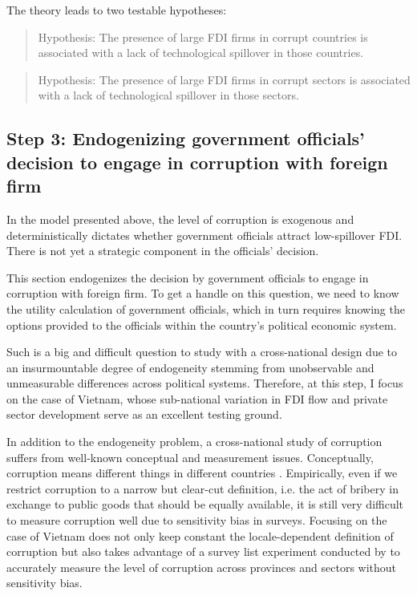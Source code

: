 The theory leads to two testable hypotheses:

\begin{quote}
Hypothesis: The presence of large FDI firms in corrupt countries is associated with a lack of technological spillover in those countries.
\end{quote}

\begin{quote}
Hypothesis: The presence of large FDI firms in corrupt sectors is associated with a lack of technological spillover in those sectors.
\end{quote}

\subsection{Step 3: Endogenizing government officials' decision to engage in corruption with foreign firm}

In the model presented above, the level of corruption is exogenous and deterministically dictates whether government officials attract low-spillover FDI. There is not yet a strategic component in the officials' decision. 

This section endogenizes the decision by government officials to engage in corruption with foreign firm. To get a handle on this question, we need to know the utility calculation of government officials, which in turn requires knowing the options provided to the officials within the country's political economic system. 

Such is a big and difficult question to study with a cross-national design due to an insurmountable degree of endogeneity stemming from unobservable and unmeasurable differences across political systems. Therefore, at this step, I focus on the case of Vietnam, whose sub-national variation in FDI flow and private sector development serve as an excellent testing ground.

In addition to the endogeneity problem, a cross-national study of corruption suffers from well-known conceptual and measurement issues. Conceptually, corruption means different things in different countries \citep{Rosen2010}. Empirically, even if we restrict corruption to a narrow but clear-cut definition, i.e. the act of bribery in exchange to public goods that should be equally available, it is still very difficult to measure corruption well due to sensitivity bias in surveys. Focusing on the case of Vietnam does not only keep constant the locale-dependent definition of corruption but also takes advantage of a survey list experiment conducted by \citet{Malesky2015} to accurately measure the level of corruption across provinces and sectors without sensitivity bias.

